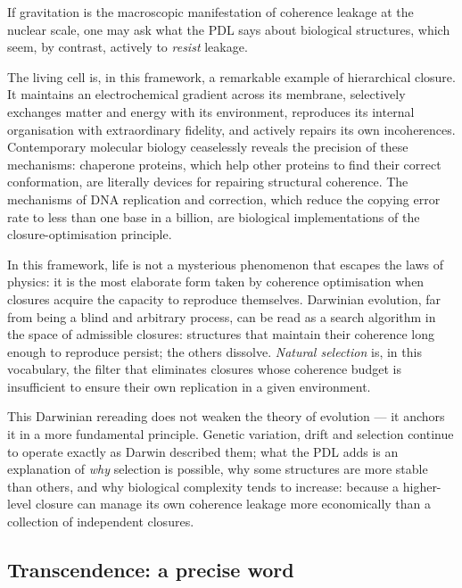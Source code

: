 \documentclass[11pt, a4paper, openright]{book}
\begin{document}
If gravitation is the macroscopic manifestation of coherence leakage at the nuclear scale, one may ask what the PDL says about biological structures, which seem, by contrast, actively to \emph{resist} leakage.

\medskip

The living cell is, in this framework, a remarkable example of hierarchical closure. It maintains an electrochemical gradient across its membrane, selectively exchanges matter and energy with its environment, reproduces its internal organisation with extraordinary fidelity, and actively repairs its own incoherences. Contemporary molecular biology ceaselessly reveals the precision of these mechanisms: chaperone proteins, which help other proteins to find their correct conformation, are literally devices for repairing structural coherence. The mechanisms of DNA replication and correction, which reduce the copying error rate to less than one base in a billion, are biological implementations of the closure-optimisation principle.

\medskip

In this framework, life is not a mysterious phenomenon that escapes the laws of physics: it is the most elaborate form taken by coherence optimisation when closures acquire the capacity to reproduce themselves. Darwinian evolution, far from being a blind and arbitrary process, can be read as a search algorithm in the space of admissible closures: structures that maintain their coherence long enough to reproduce persist; the others dissolve. \emph{Natural selection} is, in this vocabulary, the filter that eliminates closures whose coherence budget is insufficient to ensure their own replication in a given environment.

\medskip

This Darwinian rereading does not weaken the theory of evolution — it anchors it in a more fundamental principle. Genetic variation, drift and selection continue to operate exactly as Darwin described them; what the PDL adds is an explanation of \emph{why} selection is possible, why some structures are more stable than others, and why biological complexity tends to increase: because a higher-level closure can manage its own coherence leakage more economically than a collection of independent closures.

\subsection*{Transcendence: a precise word}
\end{document}
